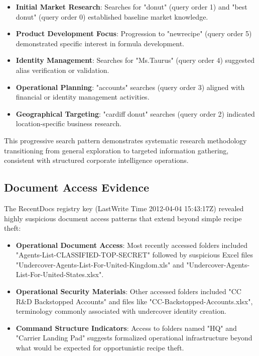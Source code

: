 \begin{itemize}
    \item \textbf{Initial Market Research}: Searches for "donut" (query order 1) and "best donut" (query order 0) established baseline market knowledge.
    
    \item \textbf{Product Development Focus}: Progression to "newrecipe" (query order 5) demonstrated specific interest in formula development.
    
    \item \textbf{Identity Management}: Searches for "Ms.Taurus" (query order 4) suggested alias verification or validation.
    
    \item \textbf{Operational Planning}: "accounts" searches (query order 3) aligned with financial or identity management activities.
    
    \item \textbf{Geographical Targeting}: "cardiff donut" searches (query order 2) indicated location-specific business research.
\end{itemize}

This progressive search pattern demonstrates systematic research methodology transitioning from general exploration to targeted information gathering, consistent with structured corporate intelligence operations.

\subsection{Document Access Evidence}
The RecentDocs registry key (LastWrite Time 2012-04-04 15:43:17Z) revealed highly suspicious document access patterns that extend beyond simple recipe theft:

\begin{itemize}
    \item \textbf{Operational Document Access}: Most recently accessed folders included "Agents-List-CLASSIFIED-TOP-SECRET" followed by suspicious Excel files "Undercover-Agents-List-For-United-Kingdom.xls" and "Undercover-Agents-List-For-United-States.xlsx".
    
    \item \textbf{Operational Security Materials}: Other accessed folders included "CC R\&D Backstopped Accounts" and files like "CC-Backstopped-Accounts.xlsx", terminology commonly associated with undercover identity creation.
    
    \item \textbf{Command Structure Indicators}: Access to folders named "HQ" and "Carrier Landing Pad" suggests formalized operational infrastructure beyond what would be expected for opportunistic recipe theft.
\end{itemize}

